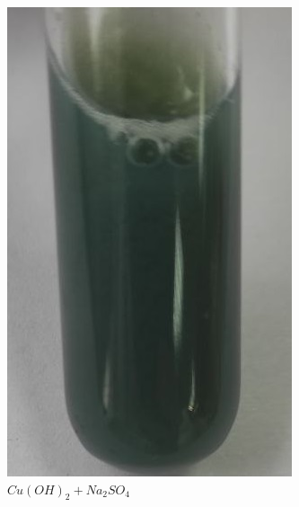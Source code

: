 \begin{figure}[h]
    \centering
    \begin{subfigure}[b]{0.45\textwidth}
    \includegraphics[width=\textwidth]{Ex_5/Cu_2.jpg}
    \caption{$Cu(OH)_2 + Na_2SO_4$}
    \end{subfigure}
    \quad
    \begin{subfigure}[b]{0.45\textwidth}

\end{subfigure}
\end{figure}
